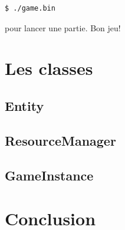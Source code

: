\documentclass{article}
\begin{document}
\begin{lstlisting}[language=bash]
$ ./game.bin
\end{lstlisting}

pour lancer une partie. Bon jeu!

\section{Les classes}


\subsection{Entity}

\subsection{ResourceManager}

\subsection{GameInstance}

\section{Conclusion}
\end{document}
